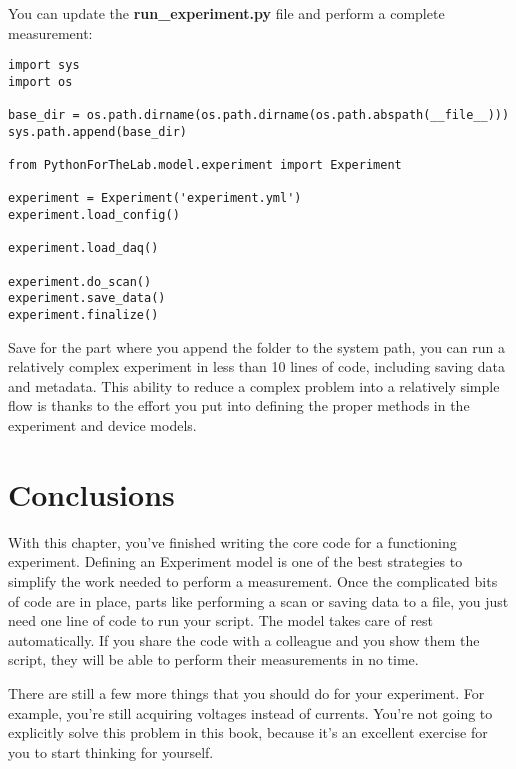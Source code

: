 You can update the \textbf{run\_experiment.py} file and perform a complete measurement:

\begin{verbatim}
import sys
import os

base_dir = os.path.dirname(os.path.dirname(os.path.abspath(__file__)))
sys.path.append(base_dir)

from PythonForTheLab.model.experiment import Experiment

experiment = Experiment('experiment.yml')
experiment.load_config()

experiment.load_daq()

experiment.do_scan()
experiment.save_data()
experiment.finalize()
\end{verbatim}

Save for the part where you append the folder to the system path, you can run a relatively complex experiment in less than 10 lines of code, including saving data and metadata. This ability to reduce a complex problem into a relatively simple flow is thanks to the effort you put into defining the proper methods in the experiment and device models.

\section{Conclusions}\label{sec:experiment-model-conclusions}
With this chapter, you've finished writing the core code for a functioning experiment. Defining an Experiment model is one of the best strategies to simplify the work needed to perform a measurement. Once the complicated bits of code are in place, parts like performing a scan or saving data to a file, you just need one line of code to run your script. The model takes care of rest automatically. If you share the code with a colleague and you show them the  script, they will be able to perform their measurements in no time.

There are still a few more things that you should do for your experiment. For example, you're still acquiring voltages instead of currents. You're not going to explicitly solve this problem in this book, because it's an excellent exercise for you to start thinking for yourself.


